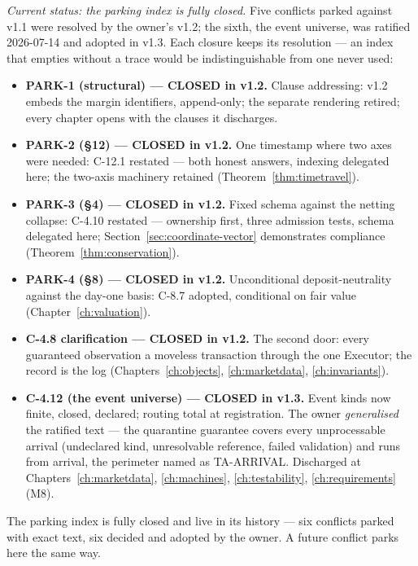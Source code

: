 \documentclass[11pt,a4paper]{article}
\begin{document}
\emph{Current status: the parking index is fully closed.} Five conflicts parked against
v1.1 were resolved by the owner's v1.2; the sixth, the event universe, was ratified
2026-07-14 and adopted in v1.3. Each closure keeps its resolution --- an index that empties
without a trace would be indistinguishable from one never used:

\begin{itemize}
\item \textbf{PARK-1 (structural) --- CLOSED in v1.2.} Clause addressing: v1.2 embeds the
  margin identifiers, append-only; the separate rendering retired; every chapter opens with
  the clauses it discharges.
\item \textbf{PARK-2 (\S12) --- CLOSED in v1.2.} One timestamp where two axes were needed:
  C-12.1 restated --- both honest answers, indexing delegated here; the two-axis machinery
  retained (Theorem~\ref{thm:timetravel}).
\item \textbf{PARK-3 (\S4) --- CLOSED in v1.2.} Fixed schema against the netting collapse:
  C-4.10 restated --- ownership first, three admission tests, schema delegated here;
  Section~\ref{sec:coordinate-vector} demonstrates compliance
  (Theorem~\ref{thm:conservation}).
\item \textbf{PARK-4 (\S8) --- CLOSED in v1.2.} Unconditional deposit-neutrality against
  the day-one basis: C-8.7 adopted, conditional on fair value (Chapter~\ref{ch:valuation}).
\item \textbf{C-4.8 clarification --- CLOSED in v1.2.} The second door: every guaranteed
  observation a moveless transaction through the one Executor; the record is the log
  (Chapters~\ref{ch:objects}, \ref{ch:marketdata}, \ref{ch:invariants}).
\item \textbf{C-4.12 (the event universe) --- CLOSED in v1.3.} Event kinds now finite, closed,
  declared; routing total at registration. The owner \emph{generalised} the ratified text ---
  the quarantine guarantee covers every unprocessable arrival (undeclared kind, unresolvable
  reference, failed validation) and runs from arrival, the perimeter named as TA-ARRIVAL.
  Discharged at Chapters~\ref{ch:marketdata}, \ref{ch:machines}, \ref{ch:testability},
  \ref{ch:requirements} (M8).
\end{itemize}

\noindent The parking index is fully closed and live in its history --- six conflicts parked
with exact text, six decided and adopted by the owner. A future conflict parks here the same way.
\end{document}
